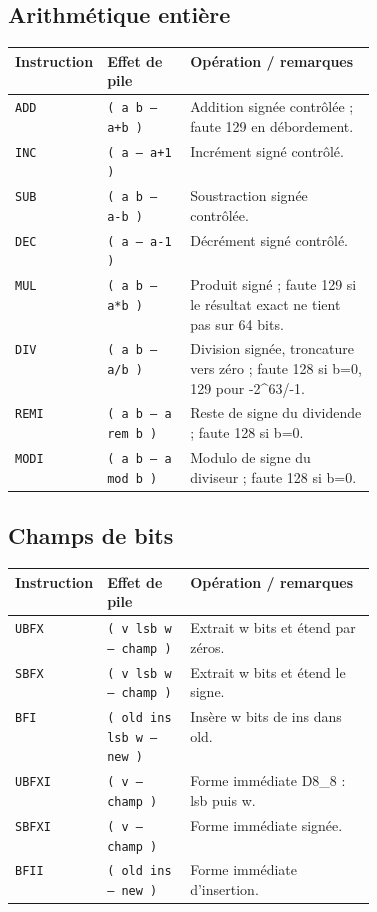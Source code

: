 \documentclass[10pt,a4paper,twoside,openany]{book}
\renewcommand{\arraystretch}{1.12}
\begin{document}
\subsection{Arithmétique entière}
\begin{center}
\renewcommand{\arraystretch}{1.16}
\begin{tabularx}{\linewidth}{@{}p{0.19\linewidth} p{0.23\linewidth} X@{}}
\toprule \textbf{Instruction} & \textbf{Effet de pile} & \textbf{Opération / remarques}\\ \midrule
\texttt{ADD} & \texttt{( a b -- a+b )} & Addition signée contrôlée ; faute 129 en débordement.\\
\texttt{INC} & \texttt{( a -- a+1 )} & Incrément signé contrôlé.\\
\texttt{SUB} & \texttt{( a b -- a-b )} & Soustraction signée contrôlée.\\
\texttt{DEC} & \texttt{( a -- a-1 )} & Décrément signé contrôlé.\\
\texttt{MUL} & \texttt{( a b -- a*b )} & Produit signé ; faute 129 si le résultat exact ne tient pas sur 64 bits.\\
\texttt{DIV} & \texttt{( a b -- a/b )} & Division signée, troncature vers zéro ; faute 128 si b=0, 129 pour -2\textasciicircum{}63/-1.\\
\texttt{REMI} & \texttt{( a b -- a rem b )} & Reste de signe du dividende ; faute 128 si b=0.\\
\texttt{MODI} & \texttt{( a b -- a mod b )} & Modulo de signe du diviseur ; faute 128 si b=0.\\
\bottomrule
\end{tabularx}
\end{center}
\subsection{Champs de bits}
\begin{center}
\renewcommand{\arraystretch}{1.16}
\begin{tabularx}{\linewidth}{@{}p{0.19\linewidth} p{0.23\linewidth} X@{}}
\toprule \textbf{Instruction} & \textbf{Effet de pile} & \textbf{Opération / remarques}\\ \midrule
\texttt{UBFX} & \texttt{( v lsb w -- champ )} & Extrait w bits et étend par zéros.\\
\texttt{SBFX} & \texttt{( v lsb w -- champ )} & Extrait w bits et étend le signe.\\
\texttt{BFI} & \texttt{( old ins lsb w -- new )} & Insère w bits de ins dans old.\\
\texttt{UBFXI} & \texttt{( v -- champ )} & Forme immédiate D8\_8 : lsb puis w.\\
\texttt{SBFXI} & \texttt{( v -- champ )} & Forme immédiate signée.\\
\texttt{BFII} & \texttt{( old ins -- new )} & Forme immédiate d'insertion.\\
\bottomrule
\end{tabularx}
\end{center}
\end{document}
